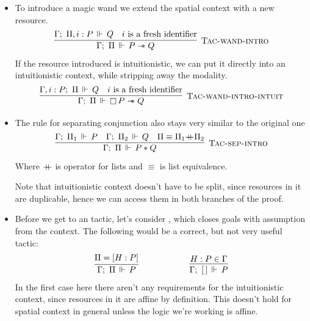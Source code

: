 \begin{itemize}
\item To introduce a magic wand we extend the spatial context with a new resource.
  \[\infer[\textsc{Tac-wand-intro}]
      {\entailsD P \wand Q}
      {\entails {\IntuD} {\SpatD, i : P} {Q} &
       i \text{ is a fresh identifier}}
  \]
  If the resource introduced is intuitionistic, we can put it directly into an intuitionistic context, while stripping away the modality.
  \[\infer[\textsc{Tac-wand-intro-intuit}]
      {\entailsD \intuit P \wand Q}
      {\entails {\IntuD, i : P} {\SpatD} {Q} &
       i \text{ is a fresh identifier}}
  \]
\item The rule for separating conjunction also stays very similar to the original one
  \[\infer[\textsc{Tac-sep-intro}]
      {\entailsD P * Q}
      {\entails {\IntuD} {\SpatD_1} P &
       \entails {\IntuD} {\SpatD_2} Q &
       \SpatD \equiv \SpatD_1 {+\hspace{-0.5em}+} \SpatD_2}
   \]
   Where \({+\hspace{-0.5em}+}\) is  operator for lists and \(\equiv\) is list equivalence.

   Note that intuitionistic context doesn't have to be split, since resources in it are duplicable, hence we can access them in both branches of the proof.
\item Before we get to an  tactic, let's consider , which closes goals with assumption  from the context.
  The following would be a correct, but not very useful tactic:
  \begin{align*}
      \infer
        {\entailsD P}
        {\SpatD = [H : P]}
    & \hspace{5em}
    & \infer
        {\entails {\IntuD} {[\,]} P}
        {H : P \in \IntuD}
  \end{align*}
  In the first case here there aren't any requirements for the intuitionistic context, since resources in it are affine by definition.
  This doesn't hold for spatial context in general unless the logic we're working is affine.


\end{itemize}
